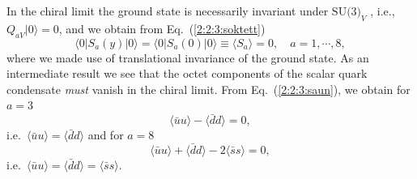 \documentclass[twoside,12pt]{article}
\begin{document}
   In the chiral limit the ground state is necessarily invariant under
$\mbox{SU(3)}_V$ \cite{Vafa:1983tf}, i.e., $Q_{aV}|0\rangle=0$, and we
obtain from Eq.\ (\ref{2:2:3:soktett})
\begin{equation}
\label{2:2:3:saun}
\langle 0|S_a(y)|0\rangle
=\langle 0|S_a(0)|0\rangle
\equiv\langle S_a\rangle =0,\quad a=1,\cdots,8,
\end{equation}
where we made use of translational invariance of the ground state.
   As an intermediate result we see that the octet components of the scalar quark condensate
{\em must} vanish in the chiral limit.
   From Eq.\ (\ref{2:2:3:saun}), we obtain for $a=3$
$$\langle\bar{u}u\rangle-\langle\bar{d}d\rangle=0,$$
i.e.\ $\langle\bar{u}u\rangle=\langle\bar{d}d\rangle$
and for $a=8$
$$\langle\bar{u}u\rangle+\langle\bar{d}d\rangle
-2\langle\bar{s}s\rangle=0,
$$
i.e.\ $\langle\bar{u}u\rangle=\langle\bar{d}d\rangle=
\langle\bar{s}s\rangle$.
\end{document}
